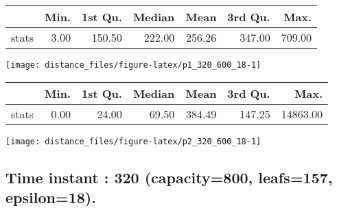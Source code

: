 \documentclass[
  9pt,
  landscape]{article}
\begin{document}
\begin{minipage}{0.5\textwidth} 
\centering 
\begin{tabular}{rrrrrrr}
  \hline
 & Min. & 1st Qu. & Median & Mean & 3rd Qu. & Max. \\ 
  \hline
stats & 3.00 & 150.50 & 222.00 & 256.26 & 347.00 & 709.00 \\ 
   \hline
\end{tabular}
\vspace{0.5cm} 


\texttt{[image: distance\_files/figure-latex/p1\_320\_600\_18-1]} 

\end{minipage} 
\begin{minipage}{0.5\textwidth} 
\centering 
\begin{tabular}{rrrrrrr}
  \hline
 & Min. & 1st Qu. & Median & Mean & 3rd Qu. & Max. \\ 
  \hline
stats & 0.00 & 24.00 & 69.50 & 384.49 & 147.25 & 14863.00 \\ 
   \hline
\end{tabular}
\vspace{0.5cm} 


\texttt{[image: distance\_files/figure-latex/p2\_320\_600\_18-1]} 

\end{minipage}

\pagebreak

\hypertarget{time-instant-320-capacity800-leafs157-epsilon18.}{%
\subsection{Time instant : 320 (capacity=800, leafs=157,
epsilon=18).}\label{time-instant-320-capacity800-leafs157-epsilon18.}}
\end{document}

